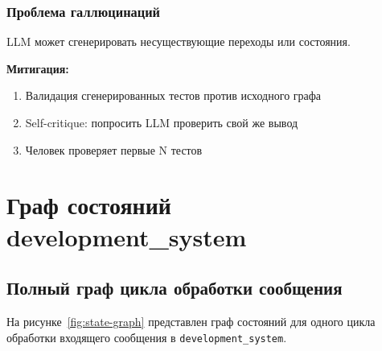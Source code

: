 \documentclass[10pt, oneside]{article}
\begin{document}
\subsubsection{Проблема галлюцинаций}

LLM может сгенерировать несуществующие переходы или состояния.

\textbf{Митигация:}
\begin{enumerate}[leftmargin=1.5em]
  \item Валидация сгенерированных тестов против исходного графа
  \item Self-critique: попросить LLM проверить свой же вывод
  \item Человек проверяет первые N тестов
\end{enumerate}

\section{Граф состояний development\_system}

\subsection{Полный граф цикла обработки сообщения}

На рисунке~\ref{fig:state-graph} представлен граф состояний для одного
цикла обработки входящего сообщения в \texttt{development\_system}.
\end{document}
